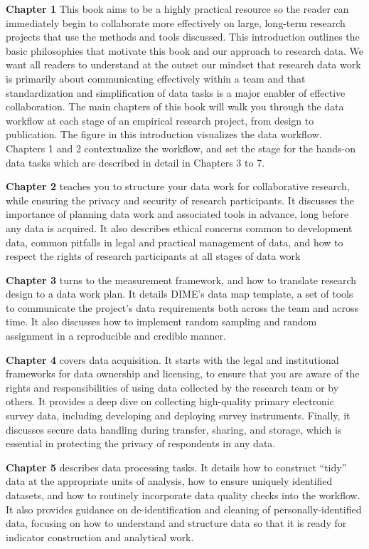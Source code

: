 \documentclass[]{tufte-book}
\begin{document}
\textbf{Chapter 1} This book aims to be a highly practical resource so
the reader can immediately begin to collaborate more effectively on
large, long-term research projects that use the methods and tools
discussed. This introduction outlines the basic philosophies that
motivate this book and our approach to research data. We want all
readers to understand at the outset our mindset that research data work
is primarily about communicating effectively within a team and that
standardization and simplification of data tasks is a major enabler of
effective collaboration. The main chapters of this book will walk you
through the data workflow at each stage of an empirical research
project, from design to publication. The figure in this introduction
visualizes the data workflow. Chapters 1 and 2 contextualize the
workflow, and set the stage for the hands-on data tasks which are
described in detail in Chapters 3 to 7.

\textbf{Chapter 2} teaches you to structure your data work for
collaborative research, while ensuring the privacy and security of
research participants. It discusses the importance of planning data work
and associated tools in advance, long before any data is acquired. It
also describes ethical concerns common to development data, common
pitfalls in legal and practical management of data, and how to respect
the rights of research participants at all stages of data work

\textbf{Chapter 3} turns to the measurement framework, and how to
translate research design to a data work plan. It details DIME's data
map template, a set of tools to communicate the project's data
requirements both across the team and across time. It also discusses how
to implement random sampling and random assignment in a reproducible and
credible manner.

\textbf{Chapter 4} covers data acquisition. It starts with the legal and
institutional frameworks for data ownership and licensing, to ensure
that you are aware of the rights and responsibilities of using data
collected by the research team or by others. It provides a deep dive on
collecting high-quality primary electronic survey data, including
developing and deploying survey instruments. Finally, it discusses
secure data handling during transfer, sharing, and storage, which is
essential in protecting the privacy of respondents in any data.

\textbf{Chapter 5} describes data processing tasks. It details how to
construct ``tidy'' data at the appropriate units of analysis, how to
ensure uniquely identified datasets, and how to routinely incorporate
data quality checks into the workflow. It also provides guidance on
de-identification and cleaning of personally-identified data, focusing
on how to understand and structure data so that it is ready for
indicator construction and analytical work.
\end{document}
